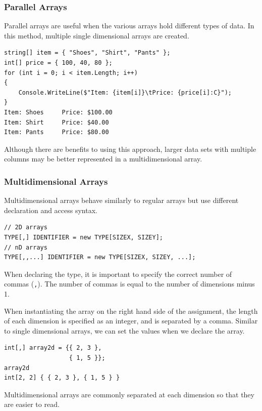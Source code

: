\documentclass{article}
\def\customlinemarker#1#2{
    \edef\thelstnumber{%
        \unexpanded{%
            \ifnum#1=\value{lstnumber}\relax
              #2%
            \fi}%
        \ifx\thelstnumber\relax\else
        \expandafter\unexpanded\expandafter{\thelstnumber}%
        \fi
    }
}
\begin{document}
\subsubsection{Parallel Arrays}
Parallel arrays are useful when the various arrays
hold different types of data. In this method, multiple
single dimensional arrays are created.
\begingroup
\let\thelstnumber\relax
\customlinemarker{1}{\$}
\customlinemarker{2}{\$}
\customlinemarker{3}{\$}
\customlinemarker{4}{.}
\customlinemarker{5}{.}
\customlinemarker{6}{.}
\begin{lstlisting}
string[] item = { "Shoes", "Shirt", "Pants" };
int[] price = { 100, 40, 80 };
for (int i = 0; i < item.Length; i++) 
{
    Console.WriteLine($"Item: {item[i]}\tPrice: {price[i]:C}");
}
Item: Shoes     Price: $100.00
Item: Shirt     Price: $40.00
Item: Pants     Price: $80.00
\end{lstlisting}
\endgroup
Although there are benefits to using this approach, larger data
sets with multiple columns may be better represented in a
multidimensional array.
\subsubsection{Multidimensional Arrays}
Multidimensional arrays behave similarly to regular arrays
but use different declaration and access syntax.
\begin{lstlisting}[numbers=none]
// 2D arrays
TYPE[,] IDENTIFIER = new TYPE[SIZEX, SIZEY];
// nD arrays
TYPE[,,...] IDENTIFIER = new TYPE[SIZEX, SIZEY, ...];
\end{lstlisting}
When declaring the type, it is important to specify the correct
number of commas (\lstinline{,}). The number of commas is equal to
the number of dimensions minus 1.

When instantiating the array on the right hand side of the assignment,
the length of each dimension is specified as an integer, and is separated by a comma.
Similar to single dimensional arrays, we can set the values when we declare the array.
\begingroup
\let\thelstnumber\relax
\customlinemarker{1}{\$}
\customlinemarker{2}{.}
\customlinemarker{3}{\$}
\begin{lstlisting}
int[,] array2d = {{ 2, 3 },
                  { 1, 5 }};
array2d
int[2, 2] { { 2, 3 }, { 1, 5 } }
\end{lstlisting}
\endgroup
Multidimensional arrays are commonly separated at each dimension
so that they are easier to read.
\end{document}
